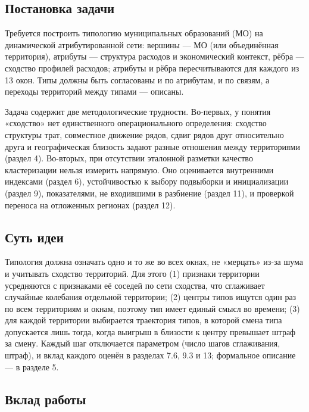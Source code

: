 \documentclass[11pt,a4paper]{article}
\begin{document}
\subsection{Постановка задачи}\label{ux43fux43eux441ux442ux430ux43dux43eux432ux43aux430-ux437ux430ux434ux430ux447ux438}

Требуется построить типологию муниципальных образований (МО) на динамической атрибутированной сети: вершины --- МО (или объединённая территория), атрибуты --- структура расходов и экономический контекст, рёбра --- сходство профилей расходов; атрибуты и рёбра пересчитываются для каждого из 13 окон. Типы должны быть согласованы и по атрибутам, и по связям, а переходы территорий между типами --- описаны.

Задача содержит две методологические трудности. Во-первых, у понятия «сходство» нет единственного операционального определения: сходство структуры трат, совместное движение рядов, сдвиг рядов друг относительно друга и географическая близость задают разные отношения между территориями (раздел 4). Во-вторых, при отсутствии эталонной разметки качество кластеризации нельзя измерить напрямую. Оно оценивается внутренними индексами (раздел 6), устойчивостью к выбору подвыборки и инициализации (раздел 9), показателями, не входившими в разбиение (раздел 11), и проверкой переноса на отложенных регионах (раздел 12).

\subsection{Суть идеи}\label{ux441ux443ux442ux44c-ux438ux434ux435ux438}

Типология должна означать одно и то же во всех окнах, не «мерцать» из-за шума и учитывать сходство территорий. Для этого (1) признаки территории усредняются с признаками её соседей по сети сходства, что сглаживает случайные колебания отдельной территории; (2) центры типов ищутся один раз по всем территориям и окнам, поэтому тип имеет единый смысл во времени; (3) для каждой территории выбирается траектория типов, в которой смена типа допускается лишь тогда, когда выигрыш в близости к центру превышает штраф за смену. Каждый шаг отключается параметром (число шагов сглаживания, штраф), и вклад каждого оценён в разделах 7.6, 9.3 и 13; формальное описание --- в разделе 5.

\subsection{Вклад работы}\label{ux432ux43aux43bux430ux434-ux440ux430ux431ux43eux442ux44b}
\end{document}
